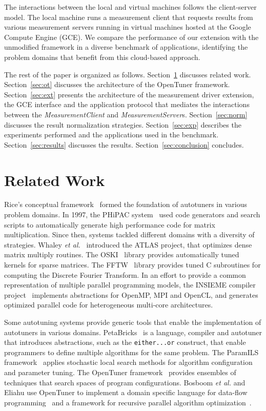 \documentclass[a4paper, 12pt]{article}
\begin{document}
The interactions between the local and virtual machines follows
the client-server model. The local machine runs a measurement client that
requests results from various measurement servers running in virtual machines
hosted at the Google Compute Engine (GCE).
We compare the performance of our extension with the
unmodified framework in a diverse benchmark of applications, identifying
the problem domains that benefit from this cloud-based approach.

The rest of the paper is organized as follows.
Section~\ref{sec:related} discusses related work.
Section~\ref{sec:ot} discusses the architecture of the OpenTuner framework.
Section~\ref{sec:ext} presents the architecture of the measurement driver
extension, the GCE interface and the application protocol
that mediates the interactions between the \emph{MeasurementClient} and
\emph{MeasurementServer}s.
Section~\ref{sec:norm} discusses the result normalization strategies.
Section~\ref{sec:exp} describes the experiments performed and the
applications used in the benchmark.
Section~\ref{sec:results} discusses the results.
Section~\ref{sec:conclusion} concludes.

\section{Related Work} \label{sec:related}

Rice's conceptual framework~\cite{rice1976algorithm} formed the foundation
of autotuners in various problem domains.  In 1997, the PHiPAC
system~\cite{bilmes1997phipac} used code generators and search scripts to
automatically generate high performance code
for matrix multiplication. Since then, systems tackled different domains with a
diversity of strategies. Whaley \emph{et al.}~\cite{whaley1998atlas} introduced
the ATLAS project, that optimizes dense matrix multiply routines. The
OSKI~\cite{vuduc2005oski} library provides automatically tuned kernels for
sparse matrices. The FFTW~\cite{frigo1998fftw} library provides tuned C
subroutines for computing the Discrete Fourier Transform.  In an effort to
provide a common representation of multiple parallel programming models, the
INSIEME compiler project~\cite{jordan2012multi} implements abstractions for
OpenMP, MPI and OpenCL, and generates optimized parallel code for heterogeneous
multi-core architectures.

Some autotuning systems provide generic tools that enable the implementation of
autotuners in various domains. PetaBricks~\cite{ansel2009petabricks} is a
language, compiler and autotuner that introduces abstractions, such as the
\texttt{\footnotesize either...or} construct, that enable programmers to define
multiple algorithms for the same problem.  The ParamILS
framework~\cite{hutter2009paramils} applies stochastic local search methods
for algorithm configuration and parameter tuning.  The OpenTuner
framework~\cite{ansel2014opentuner} provides ensembles of techniques that
search spaces of program configurations. Bosboom \emph{et al.} and Eliahu use
OpenTuner to implement a domain specific language for data-flow
programming~\cite{bosboom2014streamjit} and a framework for recursive parallel
algorithm optimization~\cite{eliahu2015frpa}.
\end{document}
